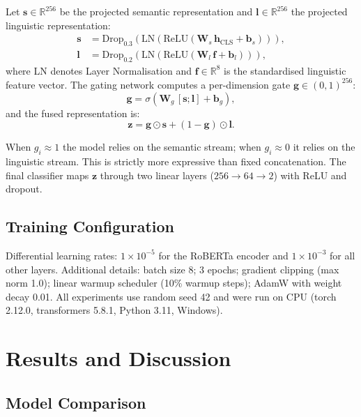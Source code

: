 \documentclass[10pt,twoside]{article}
\begin{document}
Let $\mathbf{s} \in \mathbb{R}^{256}$ be the projected
semantic representation and
$\mathbf{l} \in \mathbb{R}^{256}$ the projected linguistic
representation:
\begin{align}
  \mathbf{s} &= \mathrm{Drop}_{0.3}\!\left(
    \mathrm{LN}\!\left(
      \mathrm{ReLU}(\mathbf{W}_s\,\mathbf{h}_{\mathrm{CLS}}
      + \mathbf{b}_s)\right)\right), \\
  \mathbf{l} &= \mathrm{Drop}_{0.2}\!\left(
    \mathrm{LN}\!\left(
      \mathrm{ReLU}(\mathbf{W}_l\,\mathbf{f}
      + \mathbf{b}_l)\right)\right),
\end{align}
where LN denotes Layer Normalisation and
$\mathbf{f} \in \mathbb{R}^{8}$ is the standardised
linguistic feature vector.
The gating network computes a per-dimension gate
$\mathbf{g} \in (0,1)^{256}$:
\begin{equation}
  \mathbf{g} = \sigma\!\left(
    \mathbf{W}_g\,[\mathbf{s};\mathbf{l}]
    + \mathbf{b}_g\right),
\end{equation}
and the fused representation is:
\begin{equation}
  \mathbf{z} = \mathbf{g} \odot \mathbf{s}
             + (1 - \mathbf{g}) \odot \mathbf{l}.
\end{equation}

When $g_i \approx 1$ the model relies on the semantic stream;
when $g_i \approx 0$ it relies on the linguistic stream.
This is strictly more expressive than fixed concatenation.
The final classifier maps $\mathbf{z}$ through two linear
layers ($256{\to}64{\to}2$) with ReLU and dropout.

\subsection{Training Configuration}

Differential learning rates: $1{\times}10^{-5}$ for the
RoBERTa encoder and $1{\times}10^{-3}$ for all other layers.
Additional details: batch size 8; 3 epochs; gradient clipping
(max norm 1.0); linear warmup scheduler (10\% warmup steps);
AdamW with weight decay 0.01.
All experiments use random seed 42 and were run on CPU
(torch 2.12.0, transformers 5.8.1, Python 3.11, Windows).

\section{Results and Discussion}

\subsection{Model Comparison}
\end{document}
